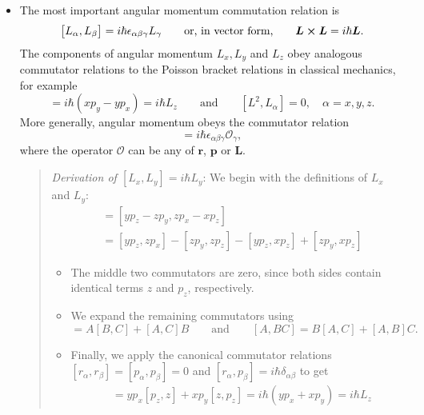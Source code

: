 \documentclass[11pt, a4paper]{article}
\newcommand{\eqtext}[1]{\qquad \text{#1} \qquad}
\renewcommand{\vec}[1]{\bm{#1}}  %
\renewcommand{\r}{\vec{r}}  %
\renewcommand{\L}{\vec{L}}  %
\renewcommand{\O}{\mathcal{O}}  %
\begin{document}
\begin{itemize}
	\item The most important angular momentum commutation relation is
	\begin{equation*}
		\big[L_{\alpha}, L_{\beta}\big] = i \hbar \epsilon_{\alpha \beta \gamma}L_{\gamma} \eqtext{or, in vector form,} \L \cross \L = i \hbar \L.
	\end{equation*}
	The components of angular momentum $ L_{x}, L_{y} $ and $ L_{z} $ obey analogous commutator relations to the Poisson bracket relations in classical mechanics, for example
	\begin{equation*}
		[L_{x}, L_{y}] = i\hbar(xp_{y} - yp_{x}) = i\hbar L_{z} \eqtext{and} [L^{2}, L_{\alpha}] = 0, \quad \alpha = x, y, z.
	\end{equation*}
	More generally, angular momentum obeys the commutator relation
	\begin{equation*}
		[L_{\alpha}, \O_{\beta}] = i \hbar \epsilon_{\alpha \beta \gamma}\O_{\gamma},
	\end{equation*}
	where the operator $ \O $ can be any of $ \r $, $\vec{p}$ or $ \L $.
    \begin{quote}
        \textit{Derivation of $ [L_{x}, L_{y}] = i \hbar L_{y} $}: We begin with the definitions of $ L_{x} $ and $ L_{y} $:
        \begin{align*}
            [L_{x}, L_{y}] &= [yp_{z} - zp_{y}, zp_{x} - xp_{z}]\\
            & = [yp_{z}, zp_{x}] - [zp_{y}, zp_{z}] - [yp_{z}, xp_{z}] + [zp_{y}, xp_{z}]
        \end{align*}

        \begin{itemize}
        
            \item The middle two commutators are zero, since both sides contain identical terms $ z $ and $ p_{z} $, respectively. 

            \item We expand the remaining commutators using
            \begin{equation*}
                [AB, C] = A[B, C] + [A, C]B \qquad \text{and} \qquad [A, BC] = B[A, C] + [A, B]C.
            \end{equation*}
            
            \item Finally, we apply the canonical commutator relations $ [r_{\alpha}, r_{\beta}] = [p_{\alpha}, p_{\beta}] = 0 $ and $ [r_{\alpha}, p_{\beta}] = i\hbar \delta_{\alpha \beta} $ to get
            \begin{align*}
                [L_{x}, L_{y}] &= yp_{x}[p_{z}, z] + xp_{y}[z, p_{z}] = i\hbar (yp_{x} + xp_{y}) = i\hbar L_{z}
            \end{align*}
        \end{itemize}


\end{quote}
\end{itemize}
\end{document}
